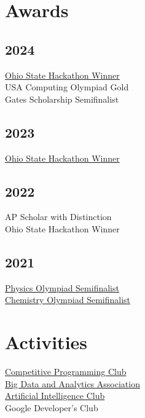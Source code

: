 \documentclass[]{Farhan_Resume_Class}
\begin{document}
\begin{minipage}[t]{0.25\textwidth}
    \sectionsep


    \section{Awards}
    \subsection{2024}
    \href{https://hack.osu.edu/hs/fall-2023/}{Ohio State Hackathon Winner} \\
    USA Computing Olympiad Gold \\
    Gates Scholarship Semifinalist
    \subsection{2023}
    \href{https://hack.osu.edu/hs/fall-2023/}{Ohio State Hackathon Winner} \\

    \subsection{2022}
    {AP Scholar with Distinction} \\
    {Ohio State Hackathon Winner} \\
    \subsection{2021}
    \href{https://www.aapt.org/physicsteam/2024/index.cfm}{Physics Olympiad Semifinalist} \\
    \href{https://www.acs.org/education/students/highschool/olympiad.html}{Chemistry Olympiad Semifinalist} \\

    \section{Activities}
    \href{https://cpcosu.github.io/}{Competitive Programming Club} \\
    \href{https://bdaaosu.org/}{Big Data and Analytics Association} \\
    \href{https://www.osuaiclub.com/}{Artificial Intelligence Club} \\
    Google Developer's Club


\end{minipage}
\end{document}
